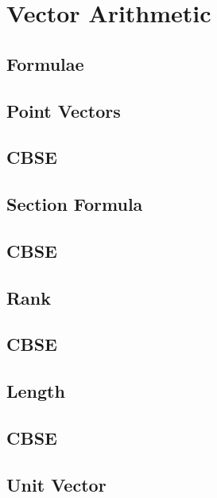 \documentclass[journal]{IEEEtran}
\begin{document}
\newpage


\tableofcontents

\newpage
\onecolumn


\renewcommand{\thetable}{\theenumi}


\section{Vector Arithmetic}
\subsection{Formulae}

\subsection{Point Vectors}

\subsection{CBSE}

\subsection{Section Formula}

\subsection{CBSE}

\subsection{Rank}

\subsection{CBSE}

\subsection{Length}

\subsection{CBSE}

\subsection{Unit Vector}

\end{document}
